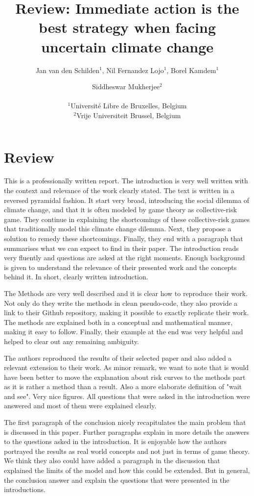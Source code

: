 \documentclass[letterpaper]{article}
\title{Review: Immediate action is the best strategy when facing uncertain climate change}
\author{Jan van den Schilden$^{1}$, Nil Fernandez Lojo$^{1}$, Borel Kamdem$^{1}$ \and Siddheswar Mukherjee$^2$ \\
\mbox{}\\
$^1$Université Libre de Bruxelles, Belgium\\
$^2$Vrije Universiteit Brussel, Belgium }
\begin{document}
\maketitle

 \section{Review}
This is a professionally written report.
The introduction is very well written with the context and relevance of the work clearly stated.
The text is written in a reversed pyramidal fashion.
It start very broad, introducing the social dilemma of climate change,
and that it is often modeled by game theory as collective-risk game.
They continue in explaining the shortcomings of these collective-risk games 
that traditionally model this climate change dilemma.
Next, they propose a solution to remedy these shortcomings.
Finally, they end with a paragraph that summarises what we can expect to find in their paper.
The introduction reads very fluently 
and questions are asked at the right moments.
Enough background is given to understand the relevance of their presented work and the concepts behind it. 
In short, clearly written introduction.

The Methods are very well described and it is clear how to reproduce their work.
Not only do they write the methods in clean pseudo-code,
they also provide a link to their Github repository,
making it possible to exactly replicate their work.
The methods are explained both in a conceptual and mathematical manner, 
making it easy to follow.
Finally, their example at the end was very helpful 
and helped to clear out any remaining ambiguity.

The authors reproduced the results of their selected paper and also added a relevant extension to their work.
As minor remark, we want to note that is would have been better 
to move the explanation about risk curves to the methods part as it is rather a method than a result.
Also a more elaborate definition of "wait and see".
Very nice figures. 
All questions that were asked in the introduction were answered and most of them were explained clearly.

The first paragraph of the conclusion nicely recapitulates the main problem that is discussed in this paper.
Further paragraphs explain in more details the answers to the questions asked in the introduction.
It is enjoyable how the authors portrayed the results as real world concepts and not just in terms of game theory.
We think they also could have added a paragraph in the discussion that explained the limits of the model and how this could be extended.
But in general,
the conclusion answer and explain the questions that were presented in the introductions.
\end{document}
